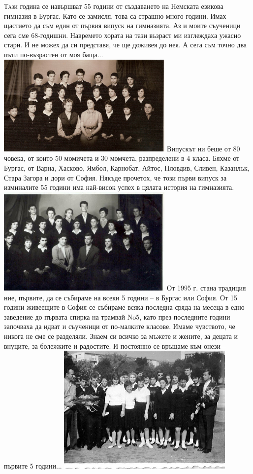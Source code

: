 \begin{multicols}{2}

\noindent \lettrine[lraise=0.2, nindent=0em, slope=-.5em]{Т}{ази} година се навършват 55 години от създаването на Немската езикова гимназия в 
Бургас. Като се замисля, това са страшно много години. Имах щастието да съм един от първия випуск на гимназията. Аз и моите съученици сега сме 68-годишни. 
Навремето хората на тази възраст ми изглеждаха ужасно стари. И не можех да си представя, че ще доживея до нея. А сега съм точно два пъти по-възрастен от моя баща...
\includegraphics[width=3.4in]{./zdravei_az/2-1.jpg}
Випускът ни беше от 80 човека, от които 50 момичета и 30 момчета, разпределени в 4 класа. Бяхме от Бургас, от Варна, Хасково, Ямбол, Карнобат, Айтос, Пловдив, Сливен, Казанлък, Стара Загора и дори от София. Някъде прочетох, че този първи випуск за изминалите 55 години има най-висок успех в цялата история на гимназията.
\includegraphics[width=3.4in]{./zdravei_az/2-2.jpg}
От 1995 г. стана традиция ние, първите, да се събираме на всеки 5 години – в Бургас или София. От 15 години живеещите в София се събираме всяка последна сряда на месеца в едно заведение до първата спирка на трамвай No5, като през последните години започваха да идват и съученици от по-малките класове. Имаме чувството, че никога не сме се разделяли. Знаем си всичко за мъжете и жените, за децата и внуците, за болежките и радостите. И постоянно се връщаме към онези – 
първите 5 години...
\includegraphics[width=3.4in]{./zdravei_az/2-3.jpg}

\end{multicols}
